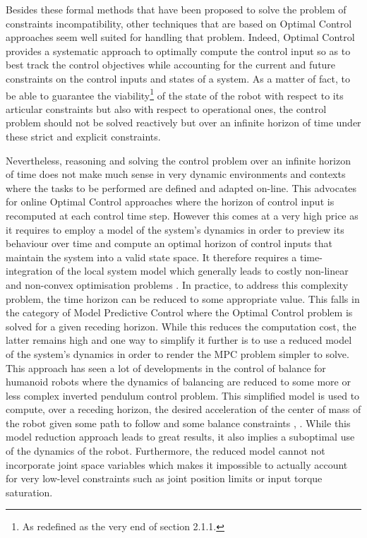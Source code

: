 Besides these formal methods that have been proposed to solve the problem of constraints incompatibility, other techniques that are based on Optimal Control approaches seem well suited for handling that problem. Indeed, Optimal Control provides a systematic approach to optimally compute the control input so as to best track the control objectives while accounting for the current and future constraints on the control inputs and states of a system. As a matter of fact, to be able to guarantee the viability\footnote{As redefined as the very end of section 2.1.1.} of the state of the robot with respect to its articular constraints but also with respect to operational ones, the control problem should not be solved reactively but over an infinite horizon of time under these strict and explicit constraints.

Nevertheless, reasoning and solving the control problem over an infinite horizon of time does not make much sense in very dynamic environments and contexts where the tasks to be performed are defined and adapted on-line. This advocates for online Optimal Control approaches where the horizon of control input is recomputed at each control time step. However this comes at a very high price as it requires to employ a model of the system's dynamics in order to preview its behaviour over time and compute an optimal horizon of control inputs that maintain the system into a valid state space. It therefore requires a time-integration of the local system model which generally leads to costly non-linear and non-convex optimisation problems \cite{2016THDR3834}. In practice, to address this complexity problem, the time horizon can be reduced to some appropriate value. This falls in the category of Model Predictive Control where the Optimal Control problem is solved for a given receding horizon. While this reduces the computation cost, the latter remains high and one way to simplify it further is to use a reduced model of the system's dynamics in order to render the MPC problem simpler to solve. This approach has seen a lot of developments in the control of balance for humanoid robots where the dynamics of balancing are reduced to some more or less complex inverted pendulum control problem. This simplified model is used to compute, over a receding horizon, the desired acceleration of the center of mass of the robot given some path to follow and some balance constraints \cite{wieber2006trajectory}, \cite{ibanez2015Emergence}. While this model reduction approach leads to great results, it also implies a suboptimal use of the dynamics of the robot. Furthermore, the reduced model cannot not incorporate joint space variables which makes it impossible to actually account for very low-level constraints such as joint position limits or input torque saturation. 

